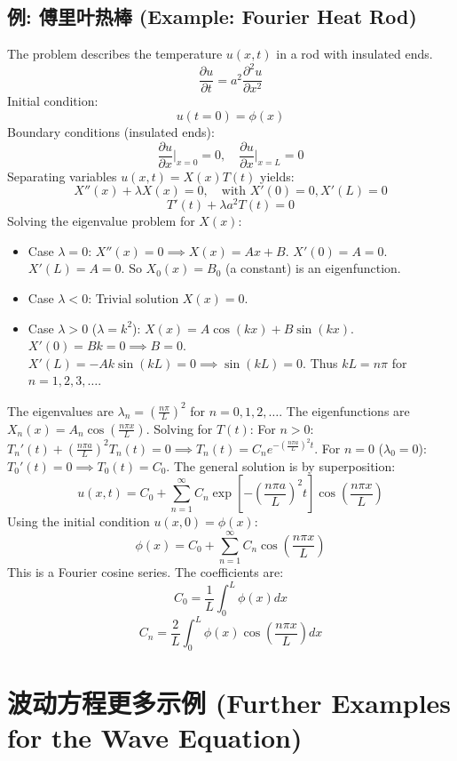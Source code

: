 \documentclass{article}
\begin{document}
	\subsection*{例: 傅里叶热棒 (Example: Fourier Heat Rod)}
	The problem describes the temperature $u(x,t)$ in a rod with insulated ends.
	$$ \frac{\partial u}{\partial t} = a^2 \frac{\partial^2 u}{\partial x^2} $$
	Initial condition:
	$$ u(t=0) = \phi(x) $$
	Boundary conditions (insulated ends):
	$$ \frac{\partial u}{\partial x}\bigg|_{x=0} = 0, \quad \frac{\partial u}{\partial x}\bigg|_{x=L} = 0 $$
	Separating variables $u(x,t) = X(x)T(t)$ yields:
	$$ X''(x) + \lambda X(x) = 0, \quad \text{with } X'(0)=0, X'(L)=0 $$
	$$ T'(t) + \lambda a^2 T(t) = 0 $$
	Solving the eigenvalue problem for $X(x)$:
	\begin{itemize}
		\item Case $\lambda=0$: $X''(x)=0 \implies X(x) = Ax+B$. $X'(0)=A=0$. $X'(L)=A=0$. So $X_0(x) = B_0$ (a constant) is an eigenfunction.
		\item Case $\lambda < 0$: Trivial solution $X(x)=0$.
		\item Case $\lambda > 0$ ($\lambda=k^2$): $X(x) = A\cos(kx)+B\sin(kx)$. $X'(0) = B k = 0 \implies B=0$. $X'(L) = -A k \sin(kL) = 0 \implies \sin(kL)=0$. Thus $kL=n\pi$ for $n=1,2,3,\dots$.
	\end{itemize}
	The eigenvalues are $\lambda_n = (\frac{n\pi}{L})^2$ for $n=0, 1, 2, \dots$.
	The eigenfunctions are $X_n(x) = A_n \cos(\frac{n\pi x}{L})$.
	Solving for $T(t)$:
	For $n>0$: $T_n'(t) + (\frac{n\pi a}{L})^2 T_n(t) = 0 \implies T_n(t) = C_n e^{-(\frac{n\pi a}{L})^2 t}$.
	For $n=0$ ($\lambda_0=0$): $T_0'(t)=0 \implies T_0(t) = C_0$.
	The general solution is by superposition:
	$$ u(x,t) = C_0 + \sum_{n=1}^{\infty} C_n \exp\left[-\left(\frac{n\pi a}{L}\right)^2 t\right] \cos\left(\frac{n\pi x}{L}\right) $$
	Using the initial condition $u(x,0)=\phi(x)$:
	$$ \phi(x) = C_0 + \sum_{n=1}^{\infty} C_n \cos\left(\frac{n\pi x}{L}\right) $$
	This is a Fourier cosine series. The coefficients are:
	$$ C_0 = \frac{1}{L} \int_0^L \phi(x) dx $$
	$$ C_n = \frac{2}{L} \int_0^L \phi(x) \cos\left(\frac{n\pi x}{L}\right) dx $$
	
	\newpage
	\section*{波动方程更多示例 (Further Examples for the Wave Equation)}
\end{document}
